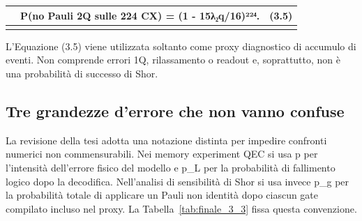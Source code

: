 {\def\LTcaptype{none} %
\begin{longtable}[]{@{}
  >{\raggedright\arraybackslash}p{}
  >{\raggedright\arraybackslash}p{}
  >{\raggedright\arraybackslash}p{}@{}}
\toprule\noalign{}
\begin{minipage}[b]{\linewidth}\raggedright
\end{minipage} & \begin{minipage}[b]{\linewidth}\centering
P(no Pauli 2Q sulle 224 CX) = (1 - 15λ₂q/16)²²⁴.
\end{minipage} & \begin{minipage}[b]{\linewidth}\raggedleft
(3.5)
\end{minipage} \\
\midrule\noalign{}
\endhead
\bottomrule\noalign{}
\endlastfoot
\end{longtable}
}

L'Equazione (3.5) viene utilizzata soltanto come proxy diagnostico di accumulo di eventi. Non comprende errori 1Q, rilassamento o readout e, soprattutto, non è una probabilità di successo di Shor.

\subsection{Tre grandezze d'errore che non vanno confuse}\label{sec:finale_3_3_4}

La revisione della tesi adotta una notazione distinta per impedire confronti numerici non commensurabili. Nei memory experiment QEC si usa p per l'intensità dell'errore fisico del modello e p\_L per la probabilità di fallimento logico dopo la decodifica. Nell'analisi di sensibilità di Shor si usa invece p\_g per la probabilità totale di applicare un Pauli non identità dopo ciascun gate compilato incluso nel proxy. La Tabella~\ref{tab:finale_3_3} fissa questa convenzione.

